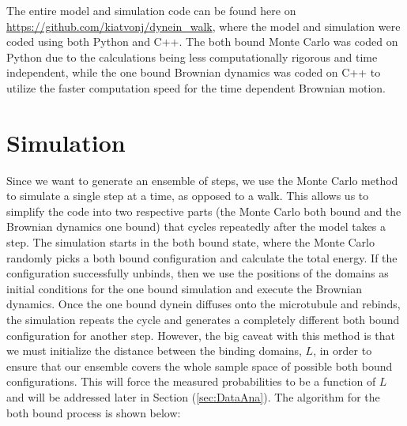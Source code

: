 
The entire model and simulation code can be found here on \url{https://github.com/kiatvonj/dynein_walk}, where the model and simulation were coded using both Python and C++. The both bound Monte Carlo was coded on Python due to the calculations being less computationally rigorous and time independent, while the one bound Brownian dynamics was coded on C++ to utilize the faster computation speed for the time  dependent Brownian motion.

\section{Simulation}
Since we want to generate an ensemble of steps, we use the Monte Carlo method to simulate a single step at a time, as opposed to a walk. This allows us to simplify the code into two respective parts (the Monte Carlo both bound and the Brownian dynamics one bound) that cycles repeatedly after the model takes a step. The simulation starts in the both bound state, where the Monte Carlo randomly picks a both bound configuration and calculate the total energy. If the configuration successfully unbinds, then we use the positions of the domains as initial conditions for the one bound simulation and execute the Brownian dynamics. Once the one bound dynein diffuses onto the microtubule and rebinds, the simulation repeats the cycle and generates a completely different both bound configuration for another step. However, the big caveat with this method is that we must initialize the distance between the binding domains, $L$, in order to ensure that our ensemble covers the whole sample space of possible both bound configurations. This will force the measured probabilities to be a function of $L$ and will be addressed later in Section (\ref{sec:DataAna}). The algorithm for the both bound process is shown below:


